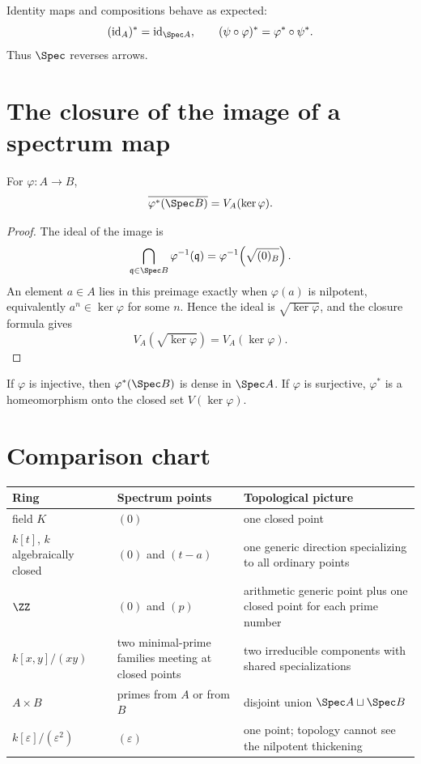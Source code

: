 Identity maps and compositions behave as expected:
\[
(\operatorname{id}_A)^\ast=\operatorname{id}_{\Spec A},
\qquad
(\psi\circ\varphi)^\ast=\varphi^\ast\circ\psi^\ast.
\]
Thus $\Spec$ reverses arrows.

\section{The closure of the image of a spectrum map}

\begin{theorem}
For $\varphi:A\to B$,
\[
\overline{\varphi^\ast(\Spec B)}=V_A(\ker\varphi).
\]
\end{theorem}

\begin{proof}
The ideal of the image is
\[
\bigcap_{\mathfrak q\in\Spec B}\varphi^{-1}(\mathfrak q)
=
\varphi^{-1}\!\left(\sqrt{(0)_B}\right).
\]
An element $a\in A$ lies in this preimage exactly when $\varphi(a)$ is nilpotent, equivalently
$a^n\in\ker\varphi$ for some $n$.  Hence the ideal is $\sqrt{\ker\varphi}$, and the closure
formula gives
\[
V_A(\sqrt{\ker\varphi})=V_A(\ker\varphi).
\]
\end{proof}

\begin{corollary}
If $\varphi$ is injective, then $\varphi^\ast(\Spec B)$ is dense in $\Spec A$.
If $\varphi$ is surjective, $\varphi^\ast$ is a homeomorphism onto the closed set
$V(\ker\varphi)$.
\end{corollary}

\section{Comparison chart}

\begin{center}
\renewcommand{\arraystretch}{1.22}
\begin{tabular}{p{}p{}p{}}
\toprule
\textbf{Ring} & \textbf{Spectrum points} & \textbf{Topological picture}\\
\midrule
field $K$ & $(0)$ & one closed point\\
$k[t]$, $k$ algebraically closed & $(0)$ and $(t-a)$ & one generic direction specializing to all ordinary points\\
$\ZZ$ & $(0)$ and $(p)$ & arithmetic generic point plus one closed point for each prime number\\
$k[x,y]/(xy)$ & two minimal-prime families meeting at closed points & two irreducible components with shared specializations\\
$A\times B$ & primes from $A$ or from $B$ & disjoint union $\Spec A\sqcup\Spec B$\\
$k[\varepsilon]/(\varepsilon^2)$ & $(\varepsilon)$ & one point; topology cannot see the nilpotent thickening\\
\bottomrule
\end{tabular}
\end{center}

